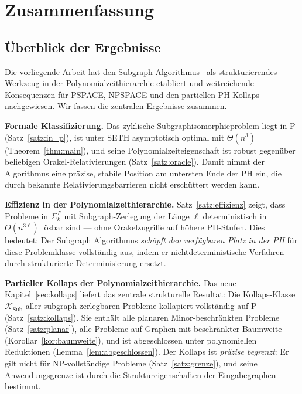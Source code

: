 ﻿\documentclass[a4paper,12pt]{article}
\theoremstyle{definition}
\begin{document}
\section{Zusammenfassung}
\label{sec:zusammenfassung}

\subsection{Überblick der Ergebnisse}

Die vorliegende Arbeit hat den Subgraph Algorithmus~\cite{epp2026subgraph}
als strukturierendes Werkzeug in der Polynomialzeithierarchie etabliert
und weitreichende Konsequenzen für PSPACE, NPSPACE und den partiellen
PH-Kollaps nachgewiesen. Wir fassen die zentralen Ergebnisse zusammen.

\textbf{Formale Klassifizierung.}
Das zyklische Subgraphisomorphieproblem liegt in P (Satz~\ref{satz:in_p}),
ist unter SETH asymptotisch optimal mit $\Theta(n^3)$ (Theorem~\ref{thm:main}),
und seine Polynomialzeiteigenschaft ist robust gegenüber beliebigen
Orakel-Relativierungen (Satz~\ref{satz:oracle}).
Damit nimmt der Algorithmus eine präzise, stabile Position am untersten Ende
der PH ein, die durch bekannte Relativierungsbarrieren nicht erschüttert werden kann.

\textbf{Effizienz in der Polynomialzeithierarchie.}
Satz~\ref{satz:effizienz} zeigt, dass Probleme in $\Sigma_k^P$ mit Subgraph-Zerlegung
der Länge $\ell$ deterministisch in $O(n^{3\ell})$ lösbar sind ---
ohne Orakelzugriffe auf höhere PH-Stufen. Dies bedeutet: Der Subgraph Algorithmus
\emph{schöpft den verfügbaren Platz in der PH} für diese Problemklasse vollständig aus,
indem er nichtdeterministische Verfahren durch strukturierte Determinisierung ersetzt.

\textbf{Partieller Kollaps der Polynomialzeithierarchie.}
Das neue Kapitel~\ref{sec:kollaps} liefert das zentrale strukturelle Resultat:
Die Kollaps-Klasse $\mathcal{K}_\mathrm{Sub}$ aller subgraph-zerlegbaren Probleme
kollapiert vollständig auf P (Satz~\ref{satz:kollaps}).
Sie enthält alle planaren Minor-beschränkten Probleme (Satz~\ref{satz:planar}),
alle Probleme auf Graphen mit beschränkter Baumweite (Korollar~\ref{kor:baumweite}),
und ist abgeschlossen unter polynomiellen Reduktionen (Lemma~\ref{lem:abgeschlossen}).
Der Kollaps ist \emph{präzise begrenzt}: Er gilt nicht für NP-vollständige Probleme
(Satz~\ref{satz:grenze}), und seine Anwendungsgrenze ist durch die
Struktureigenschaften der Eingabegraphen bestimmt.
\end{document}
